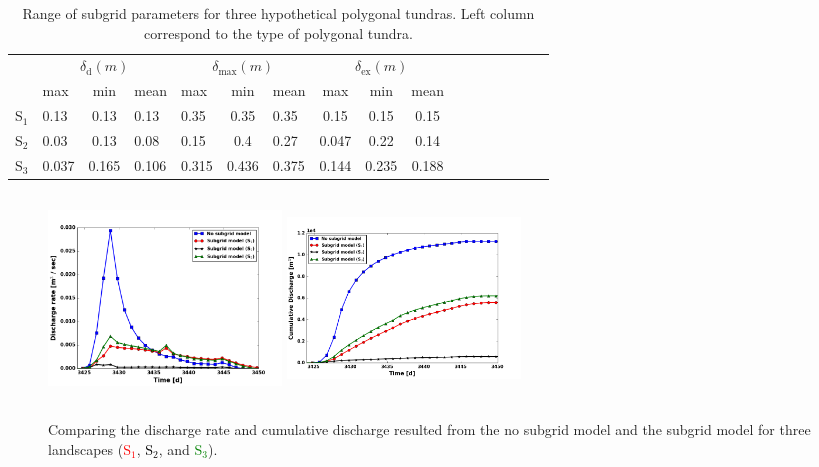 \documentclass[review,11pt]{elsarticle}
\begin{document}
\begin{table}
\caption{Range of subgrid parameters for three hypothetical polygonal tundras. Left column correspond to the type of polygonal tundra.}
\begin{tabular}{|p{9.5mm}|p{7mm}|c|p{7mm}|p{7mm}|c|p{7mm}|c|c|c|c|c|c|p{7mm}c|p{6mm}|c|}
\hline
\multirow{2}{*}{} & \multicolumn{3}{c|}{$\delta_\text{d}(m)$} & \multicolumn{3}{c|}{$\delta_\text{max}(m)$}  & \multicolumn{3}{c|}{$\delta_\text{ex}(m)$}  \\ \hhline{~---------}
& max & min & mean & max & min & mean & max & min & mean \\ \hline
S$_1$ & 0.13 & 0.13 & 0.13 & 0.35 & 0.35 & 0.35 & 0.15 & 0.15 & 0.15 \\
S$_2$ & 0.03 & 0.13 & 0.08 & 0.15 & 0.4 & 0.27 & 0.047 & 0.22 & 0.14 \\
S$_3$ & 0.037 & 0.165 & 0.106 & 0.315 & 0.436 & 0.375 & 0.144 & 0.235 & 0.188 \\ \hline
\end{tabular}
\label{dist-limits}
\end{table}


\begin{figure}[!h]
\centering 
\includegraphics[width=6.2cm, height=5.5cm]{./figures/MDM/DischargeRate-All-10yr.png}
\includegraphics[width=6.2cm, height=5.5cm]{./figures/MDM/CumulativeDischarge-All-10yr.png} 
\caption{Comparing the discharge rate and cumulative discharge resulted from the no subgrid model and the subgrid model for three landscapes (\textcolor{red}{S$_1$}, \textcolor{black}{S$_2$}, and \textcolor{green}{S$_3$}).}
\label{mdm-discharge}
\end{figure}
\end{document}
